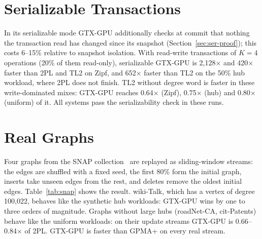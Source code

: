 \documentclass[11pt,a4paper,oneside]{report}
\newcommand{\sys}{GTX-GPU}
\begin{document}
\section{Serializable Transactions}
In its serializable mode \sys{} additionally checks at commit that nothing the transaction read has changed since its
snapshot (Section~\ref{sec:ser-proof}); this costs 6--15\% relative to snapshot isolation. With read-write transactions of $K=4$ operations (20\% of them read-only), serializable \sys{} is 2,128$\times$ and
420$\times$ faster than 2PL and TL2 on Zipf, and 652$\times$ faster than TL2 on the 50\% hub workload, where 2PL does
not finish. TL2 without degree word is faster in these write-dominated mixes: \sys{} reaches 0.64$\times$ (Zipf),
0.75$\times$ (hub) and 0.80$\times$ (uniform) of it. All systems pass the serializability check in these runs.

\section{Real Graphs}
\label{sec:snap}
Four graphs from the SNAP collection~\cite{snap} are replayed as sliding-window streams: the edges are shuffled with a
fixed seed, the first 80\% form the initial graph, inserts take unseen edges from the rest, and deletes remove the
oldest initial edges. Table~\ref{tab:snap} shows the result. wiki-Talk, which has a vertex of degree 100,022, behaves
like the synthetic hub workloads: \sys{} wins by one to three orders of magnitude. Graphs without large hubs
(roadNet-CA, cit-Patents) behave like the uniform workloads: on their update streams \sys{} is 0.66--0.84$\times$
of 2PL. \sys{} is faster than
GPMA+ on every real stream.
\end{document}
